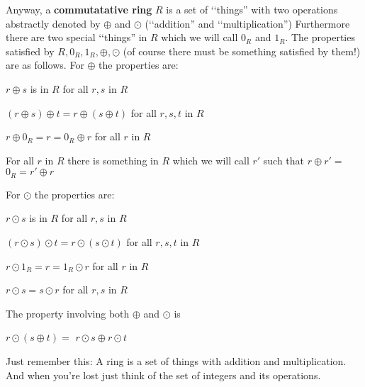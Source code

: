 Anyway, a \textbf{commutatative ring} $R$ 
is a set of \lq\lq things''
with two operations abstractly denoted by 
$\oplus$ and $\odot$ (\lq\lq addition'' and \lq\lq multiplication'')
Furthermore there are two special \lq\lq things'' in $R$ which we will call
$0_R$ and $1_R$.
The properties satisfied by $R,0_R,1_R,\oplus,\odot$ 
(of course there must be
something satisfied by them!) are as follows.
For $\oplus$ the properties are:
\begin{myenum}
\item $r \oplus s$ is in $R$ for all $r,s$ in $R$
\item 
$(r \oplus s) \oplus t
=
r \oplus (s \oplus t)$
for all $r,s,t$ in $R$
\item
$r \oplus 0_R = r = 0_R \oplus r$ 
for all
$r$ in $R$
\item For 
all $r$ in $R$ there is something in $R$ which we will call $r'$
such that $r \oplus r' =$ $0_R = r' \oplus r$
\end{myenum}
For $\odot$ the properties are:
\begin{myenum}
\item $r \odot s$ is in $R$ for all $r, s$ in $R$
\item $(r \odot s) \odot t = r \odot (s \odot t)$ for all $r,s,t$ in $R$
\item $r \odot 1_R = r = 1_R \odot r$ for all $r$ in $R$
\item $r \odot s = s \odot r$ for all $r,s$ in $R$ 
\end{myenum}
The property involving both $\oplus$ and $\odot$ is
\begin{myenum}
\item 
$r \odot (s \oplus t) =$
$r \odot s \oplus r\odot t$
\end{myenum}

Just remember this: 
A ring is a set of things with addition and multiplication.
And when you're lost just think of the set of integers and its operations.

